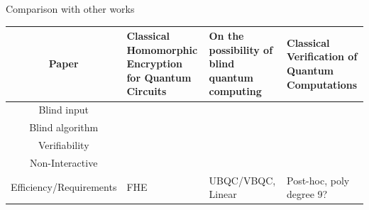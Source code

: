 \documentclass[table]{beamer}
\begin{document}
\begin{frame}[noframenumbering]{Comparison with other works}
  \begingroup
  \fontsize{10pt}{10pt}\selectfont
  \begin{table}%
    \def\colorsure{green!50!black}
    \def\colorhonnest{green}
    \def\colornoproof{yellow}
    \def\colornotpossible{red}
    \newcommand\Tstrut{\rule{0pt}{2.6ex}}       %
    \newcommand\Bstrut{\rule[-0.9ex]{0pt}{0pt}} %
    \newcommand{\TBstrut}{\Tstrut\Bstrut} %
    \begin{tabularx}{\linewidth}{ | c | X | X | X |}
      \hline
      Paper                   & \tiny Classical Homomorphic Encryption for Quantum Circuits & \tiny On the possibility of blind quantum computing & \tiny  Classical Verification of Quantum Computations \TBstrut\\
      \hline
      Blind input             & \cellcolor{\colorsure}                                      & \cellcolor{\colorhonnest}                           & \cellcolor{\colornoproof}                             \TBstrut\\
      \hline
      Blind algorithm         & \cellcolor{\colornoproof}                                   & \cellcolor{\colorhonnest}                           & \cellcolor{\colornoproof}                             \TBstrut\\
      \hline
      Verifiability           & \cellcolor{\colornotpossible}                               & \cellcolor{\colornoproof}                           & \cellcolor{\colorsure}                                \TBstrut\\
      \hline
      Non-Interactive         & \cellcolor{\colorsure}                                      & \cellcolor{\colornotpossible}                       & \cellcolor{\colornotpossible}                         \TBstrut\\
      \hline
      Efficiency/Requirements & FHE                                                         & UBQC/VBQC, Linear                                   & Post-hoc, poly degree 9?                              \TBstrut\\
      \hline
    \end{tabularx}
  \end{table}
  \endgroup
\end{frame}
\end{document}
